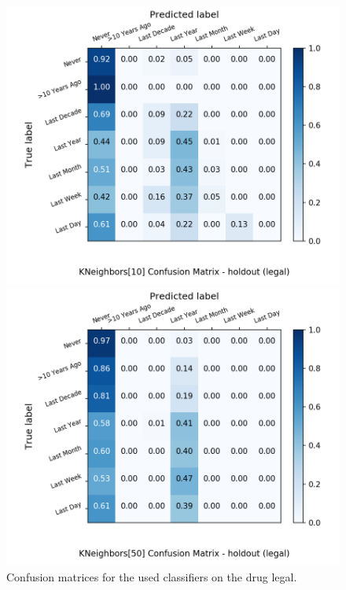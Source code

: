 \begin{figure}[H]
\begin{minipage}[b]{0.32\textwidth}
		\includegraphics[width=1.1\textwidth]{Plots/legal_KNeighbors_10_balance_False_holdout.png}
  \end{minipage}
	\begin{minipage}[b]{0.32\textwidth}
		\includegraphics[width=1.1\textwidth]{Plots/legal_KNeighbors_50_balance_False_holdout.png}
  \end{minipage}
	\caption{Confusion matrices for the used classifiers on the drug legal.}
\end{figure}

